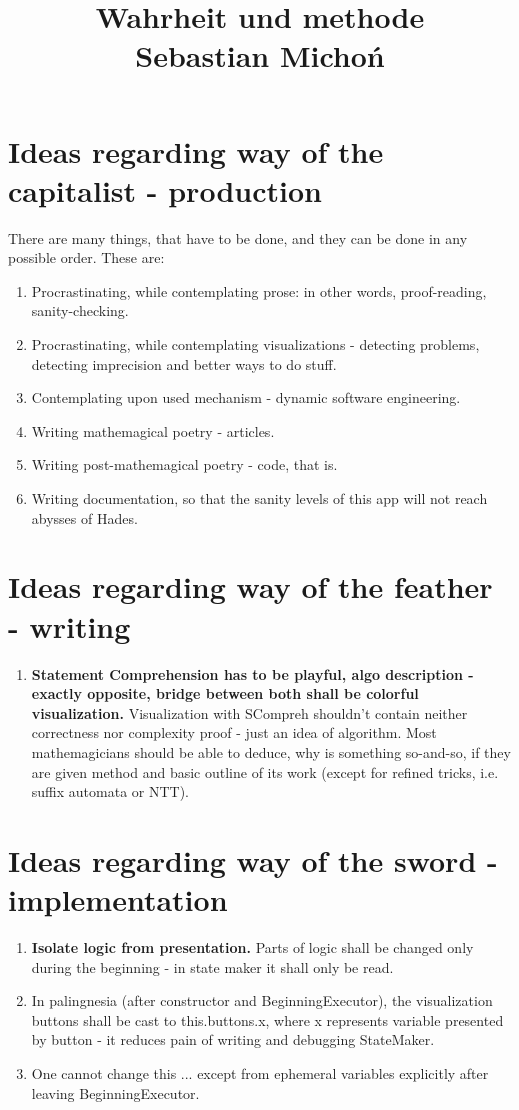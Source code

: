 \documentclass[12pt]{article}
\begin{document}
\title{Wahrheit und methode\\
\large Sebastian Michoń}
\date{\vspace{-10ex}}
\maketitle

\section {Ideas regarding way of the capitalist - production}
There are many things, that have to be done, and they can be done in any possible order. These are:
\begin{enumerate}
	\item Procrastinating, while contemplating prose: in other words, proof-reading, sanity-checking.
	\item Procrastinating, while contemplating visualizations - detecting problems, detecting imprecision and better ways to do stuff.
	\item Contemplating upon used mechanism - dynamic software engineering.
	\item Writing mathemagical poetry - articles.
	\item Writing post-mathemagical poetry - code, that is.
	\item Writing documentation, so that the sanity levels of this app will not reach abysses of Hades.
\end{enumerate}

\section {Ideas regarding way of the feather - writing}
\begin{enumerate}
	\item \textbf{Statement Comprehension has to be playful, algo description - exactly opposite, bridge between both shall be colorful visualization.} Visualization with SCompreh shouldn't contain neither correctness nor complexity proof - just an idea of algorithm. Most mathemagicians should be able to deduce, why is something so-and-so, if they are given method and basic outline of its work (except for refined tricks, i.e. suffix automata or NTT).
\end{enumerate}

\section {Ideas regarding way of the sword - implementation}
\begin{enumerate}
	\item \textbf{Isolate logic from presentation.} Parts of logic shall be changed only during the beginning - in state maker it shall only be read.
	\item In palingnesia (after constructor and BeginningExecutor), the visualization buttons shall be cast to this.buttons.x, where x represents variable presented by button - it reduces pain of writing and debugging StateMaker.
	\item One cannot change this ... except from ephemeral variables explicitly after leaving BeginningExecutor.
\end{enumerate}
\end{document}
